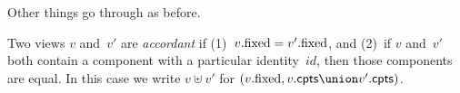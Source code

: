 

Other things go through as before.  

\begin{definition}
Two views $v$ and~$v'$ are \emph{accordant} if (1)~$v.\mathrm{fixed} = v'.\mathrm{fixed}$, and
(2)~if $v$ and~$v'$ both contain a component with a particular identity~$id$,
then those components are equal.  In this case we write $v \uplus v'$ for
$(v.\fixed, v.\cpts \union v'.\cpts)$.  
\end{definition}
